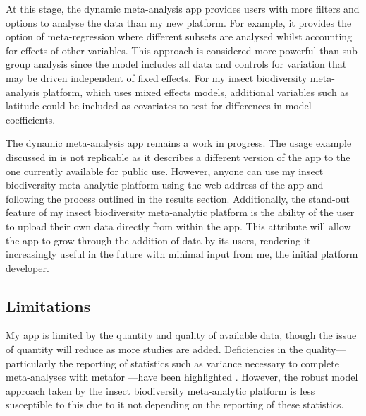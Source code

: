 \documentclass[11pt]{article}
\begin{document}
		\noindent At this stage, the dynamic meta-analysis app \citep{shackelford2021dynamic} provides users with more filters and options to analyse the data than my new platform. For example, it provides the option of meta-regression where different subsets are analysed whilst accounting for effects of other variables. This approach is considered more powerful than sub-group analysis since the model includes all data and controls for variation that may be driven independent of fixed effects. For my insect biodiversity meta-analysis platform, which uses mixed effects models, additional variables such as latitude could be included as covariates to test for differences in model coefficients. 
		
		\noindent The dynamic meta-analysis app remains a work in progress. The usage example discussed in \citet{shackelford2021dynamic} is not replicable as it describes a different version of the app to the one currently available for public use. However, anyone can use my insect biodiversity meta-analytic platform using the web address of the app and following the process outlined in the results section. Additionally, the stand-out feature of my insect biodiversity meta-analytic platform is the ability of the user to upload their own data directly from within the app. This attribute will allow the app to grow through the addition of data by its users, rendering it increasingly useful in the future with minimal input from me, the initial platform developer. 
		
		\subsection{Limitations}
		My app is limited by the quantity and quality of available data, though the issue of quantity will reduce as more studies are added. Deficiencies in the quality—particularly the reporting of statistics such as variance necessary to complete meta-analyses with metafor \citep{viechtbauer2010conducting}—have been highlighted \citep{hedges1999meta,stewart2010meta,gurevitch2018meta}. However, the robust model approach taken by the insect biodiversity meta-analytic platform is less susceptible to this due to it not depending on the reporting of these statistics. 
		
\end{document}
